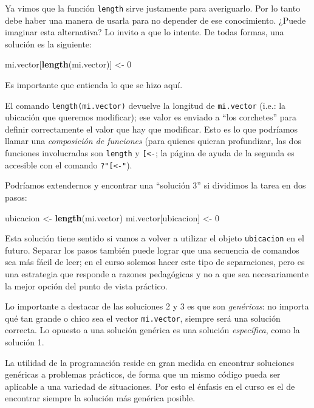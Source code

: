 \documentclass[]{article}
\newenvironment{Shaded}{}{}
\newcommand{\KeywordTok}[1]{\textcolor[rgb]{0.00,0.44,0.13}{\textbf{{#1}}}}
\newcommand{\DecValTok}[1]{\textcolor[rgb]{0.25,0.63,0.44}{{#1}}}
\newcommand{\NormalTok}[1]{{#1}}
\begin{document}
Ya vimos que la función \texttt{length} sirve justamente para
averiguarlo. Por lo tanto debe haber una manera de usarla para no
depender de ese conocimiento. ¿Puede imaginar esta alternativa? Lo
invito a que lo intente. De todas formas, una solución es la siguiente:

\begin{Shaded}
\begin{Highlighting}[]
\NormalTok{mi.vector[}\KeywordTok{length}\NormalTok{(mi.vector)] <- }\DecValTok{0}
\end{Highlighting}
\end{Shaded}
Es importante que entienda lo que se hizo aquí.

El comando \texttt{length(mi.vector)} devuelve la longitud de
\texttt{mi.vector} (i.e.: la ubicación que queremos modificar); ese
valor es enviado a ``los corchetes'' para definir correctamente el valor
que hay que modificar. Esto es lo que podríamos llamar una
\emph{composición de funciones} (para quienes quieran profundizar, las
dos funciones involucradas son \texttt{length} y
\texttt{{[}\textless{}-}; la página de ayuda de la segunda es accesible
con el comando \texttt{?"{[}\textless{}-"}).

Podríamos extendernos y encontrar una ``solución 3'' si dividimos la
tarea en dos pasos:

\begin{Shaded}
\begin{Highlighting}[]
\NormalTok{ubicacion <- }\KeywordTok{length}\NormalTok{(mi.vector)}
\NormalTok{mi.vector[ubicacion] <- }\DecValTok{0}
\end{Highlighting}
\end{Shaded}
Esta solución tiene sentido si vamos a volver a utilizar el objeto
\texttt{ubicacion} en el futuro. Separar los pasos también puede lograr
que una secuencia de comandos sea más fácil de leer; en el curso solemos
hacer este tipo de separaciones, pero es una estrategia que responde a
razones pedagógicas y no a que sea necesariamente la mejor opción del
punto de vista práctico.

Lo importante a destacar de las soluciones 2 y 3 es que son
\emph{genéricas}: no importa qué tan grande o chico sea el vector
\texttt{mi.vector}, siempre será una solución correcta. Lo opuesto a una
solución genérica es una solución \emph{específica}, como la solución 1.

La utilidad de la programación reside en gran medida en encontrar
soluciones genéricas a problemas prácticos, de forma que un mismo código
pueda ser aplicable a una variedad de situaciones. Por esto el énfasis
en el curso es el de encontrar siempre la solución más genérica posible.
\end{document}

